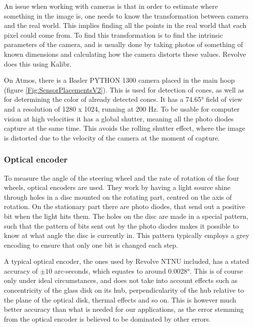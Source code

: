 An issue when working with cameras is that in order to estimate where something in the image is, one needs to know the transformation between camera and the real world. This implies finding all the points in the real world that each pixel could come from. To find this transformation is to find the intrinsic parameters of the camera, and is usually done by taking photos of something of known dimensions and calculating how the camera distorts these values. Revolve does this using Kalibr\cite{Kalibr1}\cite{Kalibr2}\cite{Kalibr3}. 

On Atmos, there is a Basler PYTHON 1300 camera placed in the main hoop (figure \ref{Fig:SensorPlacementsV2}). This is used for detection of cones, as well as for determining the color of already detected cones. It has a 74.65\si{\degree} field of view and a resolution of 1280 x 1024, running at 200 Hz. To be usable for computer vision at high velocities it has a global shutter, meaning all the photo diodes capture at the same time. This avoids the rolling shutter effect, where the image is distorted due to the velocity of the camera at the moment of capture.

\subsubsection{Optical encoder}

To measure the angle of the steering wheel and the rate of rotation of the four wheels, optical encoders are used. They work by having a light source shine through holes in a disc mounted on the rotating part, centred on the axis of rotation. On the stationary part there are photo diodes, that send out a positive bit when the light hits them. The holes on the disc are made in a special pattern, such that the pattern of bits sent out by the photo diodes makes it possible to know at what angle the disc is currently in. This pattern typically employs a grey encoding to ensure that only one bit is changed each step. 

A typical optical encoder, the ones used by Revolve NTNU included, has a stated accuracy of $\pm 10$ arc-seconds, which equates to around 0.0028\si{\degree}. This is of course only under ideal circumstances, and does not take into account effects such as concentricity of the glass disk on its hub, perpendicularity of the hub relative to the plane of the optical disk, thermal effects and so on. This is however much better accuracy than what is needed for our applications, as the error stemming from the optical encoder is believed to be dominated by other errors.

